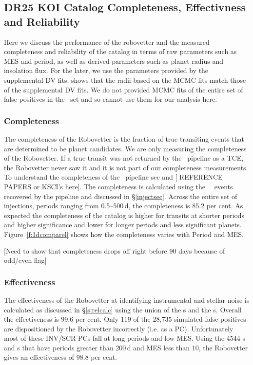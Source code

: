 \subsection{DR25 KOI Catalog Completeness, Effectivness and Reliability}
\label{s:candr}

Here we discuss the performance of the robovetter and the measured completeness and reliability of the catalog in terms of raw parameters such as MES and period, as well as derived parameters such as planet radius and insolation flux.  For the later, we use the parameters provided by the supplemental DV fits.  \citet{Christiansen2017} shows that the radii based on the MCMC fits match those of the supplemental DV fits. We do not provided MCMC fits of the entire set of false positives in the \opstce\ set and so cannot use them for our analysis here.

\subsubsection{Completeness}
The completeness of the Robovetter is the fraction of true transiting events that are determined to be planet candidates.  We are only measuring the completeness of the Robovetter. If a true transit was not returned by the \Kepler\ pipeline as a TCE, the Robovetter never saw it and it is not part of our completeness measurements. To understand the completeness of the \Kepler\ pipeline see \citet{Christiansen2017} and \citet{Burke2017} [ REFERENCE PAPERS or KSCI's here].  The completeness is calculated using the \ninjtces\ \injtce\ events recovered by the pipeline and discussed in \S\ref{injectsec}.  Across the entire set of injections, periods ranging from 0.5--500\,d, the completeness is 85.2 per cent. As expected the completeness of the catalog is higher for transits at shorter periods and higher significance and lower for longer periods and less significant planets. Figure~\ref{f:1dcomparel} shows how the completeness varies with Period and MES. 

[Need to show that completeness drops off right before 90 days because of odd/even flag]

\subsubsection{Effectiveness}
The effectiveness of the Robovetter at identifying instrumental and stellar noise is calculated as discussed in \S\ref{s:relcalc} using the union of the \invtce s and the \scrtce s. Overall the effectiveness is 99.6 per cent.  Only 119 of the 28,735 simulated false positives are dispositioned by the Robovetter incorrectly (i.e. as a PC).  Unfortunately most of these INV/SCR-PCs fall at long periods and low MES.
Using the 4544 \invtce s and \scrtce s that have periods greater than 200\,d and MES less than 10, the Robovetter gives an effectiveness of 98.8 per cent.


